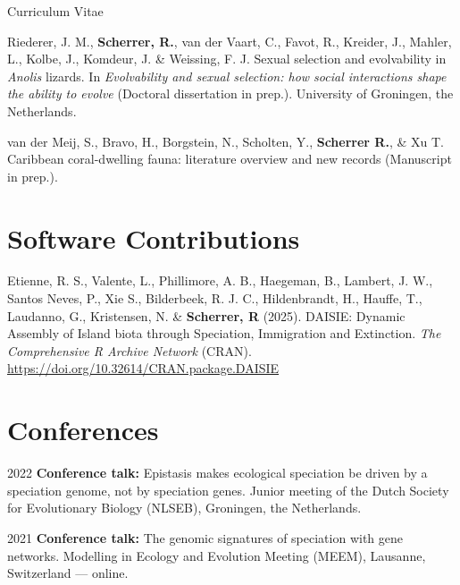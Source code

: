 \documentclass[11pt,a4paper]{article}
\begin{document}
\begin{cv}{Curriculum Vitae}
\begin{cvlist}{}
            \item[]
            Riederer, J. M., \textbf{Scherrer, R.}, van der Vaart, C., Favot, R., Kreider, J., Mahler, L., Kolbe, J., Komdeur, J. \& Weissing, F. J. Sexual selection and evolvability in \textit{Anolis} lizards. In \textit{Evolvability and sexual selection: how social interactions shape the ability to evolve} (Doctoral dissertation in prep.). University of Groningen, the Netherlands.

            \item
            van der Meij, S., Bravo, H., Borgstein, N., Scholten, Y., \textbf{Scherrer R.}, \& Xu T. Caribbean coral-dwelling fauna: literature overview and new records (Manuscript in prep.).
            
        \end{cvlist}

        \section{Software Contributions}

        \begin{cvlist}{}

            \item 
            Etienne, R. S., Valente, L., Phillimore, A. B., Haegeman, B., Lambert, J. W., Santos Neves, P., Xie S., Bilderbeek, R. J. C., Hildenbrandt, H., Hauffe, T., Laudanno, G., Kristensen, N. \& \textbf{Scherrer, R} (2025). DAISIE: Dynamic Assembly of Island biota through Speciation, Immigration and Extinction. \textit{The Comprehensive R Archive Network} (CRAN).\\
            \url{https://doi.org/10.32614/CRAN.package.DAISIE}
            
        \end{cvlist}
		
		\section{Conferences}
		
		\begin{cvlist}{}
			
			\item[2022]
			\textbf{Conference talk:} Epistasis makes ecological speciation be driven by a speciation genome, not by speciation genes. Junior meeting of the Dutch Society for Evolutionary Biology (NLSEB), Groningen, the Netherlands.
			
			\item[2021] 
			\textbf{Conference talk:} The genomic signatures of speciation with gene networks. Modelling in Ecology and Evolution Meeting (MEEM), Lausanne, Switzerland --- online.
			

\end{cvlist}
\end{cv}
\end{document}
